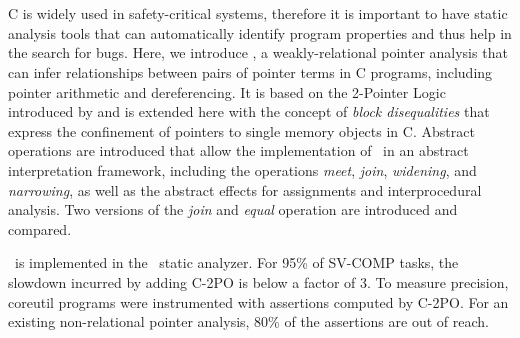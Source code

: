 \chapter{\abstractname}

C is widely used in safety-critical systems, therefore it is important to have static analysis tools that can automatically identify program properties and thus help in the search for bugs.
Here, we introduce \cpo, a weakly-relational pointer analysis that can infer relationships between pairs of pointer terms in C programs, including pointer arithmetic and dereferencing.
It is based on the 2-Pointer Logic introduced by \textcite{2pointer} and is extended here with the concept of \emph{block disequalities} that express the confinement of pointers to single memory objects in C.
Abstract operations are introduced that allow the implementation of \cpo\ in an abstract interpretation framework, including the operations \emph{meet}, \emph{join}, \emph{widening}, and \emph{narrowing}, as well as the abstract effects for assignments and interprocedural analysis.
Two versions of the \emph{join} and \emph{equal} operation are introduced and compared.

\cpo\ is implemented in the \goblint\ static analyzer.
For 95\% of SV-COMP tasks, the slowdown incurred by adding
C-2PO is below a factor of 3. To measure precision, coreutil programs were instrumented with assertions computed by C-2PO.
For an existing non-relational pointer analysis, 80\% of the assertions are out of reach.
